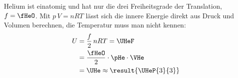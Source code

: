Helium ist einatomig und hat nur die drei Freiheitsgrade der Translation, $f = \fHeO$. Mit $p\,V = nRT$ lässt sich die innere Energie direkt aus Druck und Volumen berechnen, die Temperatur muss man nicht kennen:
\begin{align}
 U &= \frac{f}{2}\,nRT = \UHeF \\
   &= \frac{\fHeO}{2}\cdot\pHe\cdot\VHe \\
   &= \UHe \approx \result{\UHeP{3}{3}}
\end{align}
